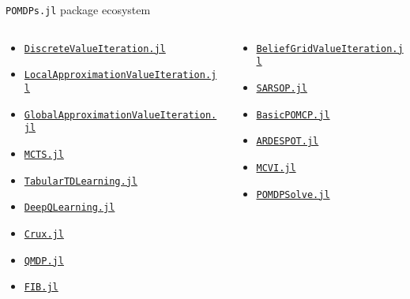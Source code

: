 \begin{frame}[fragile]{\texttt{POMDPs.jl} package ecosystem}
\begin{columns}[T,onlytextwidth]
\begin{column}{0.36\linewidth}
        {\tiny
        \begin{itemize}
            \item {\color{julia_red}\href{https://github.com/JuliaPOMDP/DiscreteValueIteration.jl}{\texttt{DiscreteValueIteration.jl}}}
            \item {\color{julia_red}\href{https://github.com/JuliaPOMDP/LocalApproximationValueIteration.jl}{\texttt{LocalApproximationValueIteration.jl}}}
            \item {\color{julia_red}\href{https://github.com/JuliaPOMDP/GlobalApproximationValueIteration.jl}{\texttt{GlobalApproximationValueIteration.jl}}}
            \item {\color{julia_red}\href{https://github.com/JuliaPOMDP/MCTS.jl}{\texttt{MCTS.jl}}}
            \item {\color{julia_red}\href{https://github.com/JuliaPOMDP/TabularTDLearning.jl}{\texttt{TabularTDLearning.jl}}}
            \item {\color{julia_red}\href{https://github.com/JuliaPOMDP/DeepQLearning.jl}{\texttt{DeepQLearning.jl}}}
            \item {\color{julia_red}\href{https://github.com/ancorso/Crux.jl}{\texttt{Crux.jl}}}
            \item {\color{julia_purple}\href{https://github.com/JuliaPOMDP/QMDP.jl}{\texttt{QMDP.jl}}}
            \item {\color{julia_purple}\href{https://github.com/JuliaPOMDP/FIB.jl}{\texttt{FIB.jl}}}
        \end{itemize}
        }
    \end{column}
    \begin{column}{0.32\linewidth}
        {\tiny
        \begin{itemize}
            \item {\color{julia_purple}\href{https://github.com/JuliaPOMDP/BeliefGridValueIteration.jl}{\texttt{BeliefGridValueIteration.jl}}}
            \item {\color{julia_purple}\href{https://github.com/JuliaPOMDP/SARSOP.jl}{\texttt{SARSOP.jl}}}
            \item {\color{julia_purple}\href{https://github.com/JuliaPOMDP/BasicPOMCP.jl}{\texttt{BasicPOMCP.jl}}}
            \item {\color{julia_purple}\href{https://github.com/JuliaPOMDP/ARDESPOT.jl}{\texttt{ARDESPOT.jl}}}
            \item {\color{julia_purple}\href{https://github.com/JuliaPOMDP/MCVI.jl}{\texttt{MCVI.jl}}}
            \item {\color{julia_purple}\href{https://github.com/JuliaPOMDP/POMDPSolve.jl}{\texttt{POMDPSolve.jl}}}

\end{itemize}}
\end{column}
\end{columns}
\end{frame}
